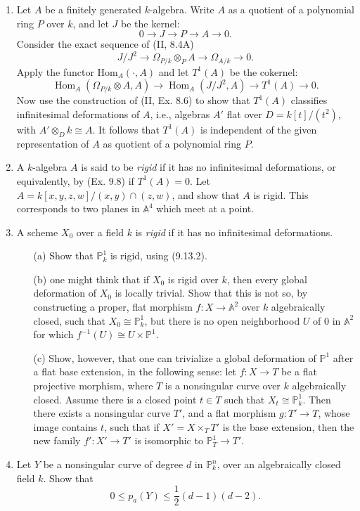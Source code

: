\documentclass{article}
\newcommand{\PP}{\mathbb{P}}
\newcommand{\A}{\mathbb{A}}
\DeclareMathOperator{\Hom}{Hom}
\begin{document}
\begin{enumerate} [label=\textbf{\arabic*.}, leftmargin=0em]
\item Let $A$ be a finitely generated $k$-algebra. Write $A$ as a quotient of a polynomial ring $P$ over $k$, and let $J$ be the kernel:
\begin{equation*}
  0 \to J \to P \to A \to 0.
\end{equation*}
Consider the exact sequence of (II, 8.4A)
\begin{equation*}
  J / J^2 \to \Omega_{P/k} \otimes_P A \to \Omega_{A / k} \to 0.
\end{equation*}
Apply the functor $\text{Hom}_A(\cdot, A)$ and let $T^1(A)$ be the cokernel:
\begin{equation*}
  \Hom_A(\Omega_{P/k} \otimes A, A) \to \Hom_A(J/J^2, A) \to T^1(A) \to 0.
\end{equation*}
Now use the construction of (II, Ex. 8.6) to show that $T^1(A)$ classifies infinitesimal deformations of $A$, i.e., algebras $A'$ flat over $D = k[t] / (t^2)$, with $A' \otimes_D k \cong A$. It follows that $T^1(A)$ is independent of the given representation of $A$ as quotient of a polynomial ring $P$.

\item A $k$-algebra $A$ is said to be \textit{rigid} if it has no infinitesimal deformations, or equivalently, by (Ex. 9.8) if $T^1(A) = 0$. Let $A = k[x, y, z, w] / (x, y) \cap (z, w)$, and show that $A$ is rigid. This corresponds to two planes in $\A^4$ which meet at a point.

\item A scheme $X_0$ over a field $k$ is \textit{rigid} if it has no infinitesimal deformations.
\begin{itemize}
  \item[(a)] Show that $\PP_k^1$ is rigid, using (9.13.2).
  \item[(b)] one might think that if $X_0$ is rigid over $k$, then every global deformation of $X_0$ is locally trivial. Show that this is not so, by constructing a proper, flat morphism $f : X \to \A^2$ over $k$ algebraically closed, such that $X_0 \cong \PP_k^1$, but there is no open neighborhood $U$ of $0$ in $\A^2$ for which $f^{-1}(U) \cong U \times \PP^1$.
  \item[(c)] Show, however, that one can trivialize a global deformation of $\PP^1$ after a flat base extension, in the following sense: let $f : X \to T$ be a flat projective morphism, where $T$ is a nonsingular curve over $k$ algebraically closed. Assume there is a closed point $t \in T$ such that $X_t \cong \PP_k^1$. Then there exists a nonsingular curve $T'$, and a flat morphism $g : T' \to T$, whose image contains $t$, such that if $X' = X \times_T T'$ is the base extension, then the new family $f' : X' \to T'$ is isomorphic to $\PP_T^1 \to T'$.
\end{itemize}

\item Let $Y$ be a nonsingular curve of degree $d$ in $\PP_k^n$, over an algebraically closed field $k$. Show that
\begin{equation*}
  0 \leq p_a(Y) \leq \frac{1}{2}(d - 1)(d - 2).
\end{equation*}


\end{enumerate}
\end{document}
